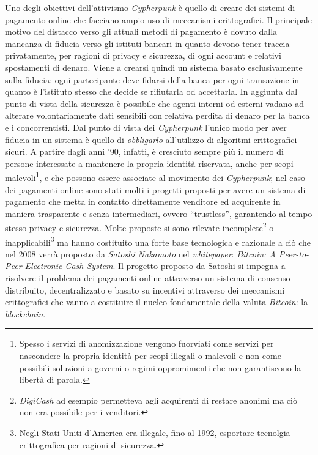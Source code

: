 Uno degli obiettivi dell'attivismo \textit{Cypherpunk} è quello di creare dei sistemi di pagamento online che facciano ampio uso di meccanismi crittografici. Il principale motivo del distacco verso gli attuali metodi di pagamento è dovuto dalla mancanza di fiducia verso gli istituti bancari in quanto devono tener traccia privatamente, per ragioni di privacy e sicurezza, di ogni account e relativi spostamenti di denaro. Viene a crearsi quindi un sistema basato esclusivamente sulla fiducia: ogni partecipante deve fidarsi della banca per ogni transazione in quanto è l'istituto stesso che decide se rifiutarla od accettarla. In aggiunta dal punto di vista della sicurezza è possibile che agenti interni od esterni vadano ad alterare volontariamente dati sensibili con relativa perdita di denaro per la banca e i concorrentisti. Dal punto di vista dei \textit{Cypherpunk} l'unico modo per aver fiducia in un sistema è quello di \textit{obbligarlo} all'utilizzo di algoritmi crittografici sicuri.\newline\newline
A partire dagli anni '90, infatti, è cresciuto sempre più il numero di persone interessate a mantenere la propria identità riservata, anche per scopi malevoli\footnote{Spesso i servizi di anomizzazione vengono fuorviati come servizi per nascondere la propria identità per scopi illegali o malevoli e non come possibili soluzioni a governi o regimi oppromimenti che non garantiscono la libertà di parola.}, e che possono essere associate al movimento dei \textit{Cypherpunk}; nel caso dei pagamenti online sono stati molti i progetti proposti per avere un sistema di pagamento che metta in contatto direttamente venditore ed acquirente in maniera trasparente e senza intermediari, ovvero ``trustless'', garantendo al tempo stesso privacy e sicurezza. Molte proposte si sono rilevate incomplete\footnote{\textit{DigiCash} ad esempio permetteva agli acquirenti di restare anonimi ma ciò non era possibile per i venditori.} o inapplicabili\footnote{Negli Stati Uniti d'America era illegale, fino al 1992, esportare tecnolgia crittografica per ragioni di sicurezza.} ma hanno costituito una forte base tecnologica e razionale a ciò che nel 2008 verrà proposto da \textit{Satoshi Nakamoto} nel \textit{whitepaper}: \textit{Bitcoin: A Peer-to-Peer Electronic Cash System}.\newline\newline
Il progetto proposto da Satoshi si impegna a risolvere il problema dei pagamenti online attraverso un sistema di consenso distribuito, decentralizzato e basato su incentivi attraverso dei meccanismi crittografici che vanno a costituire il nucleo fondamentale della valuta \textit{Bitcoin}: la \textit{blockchain}.\newline
